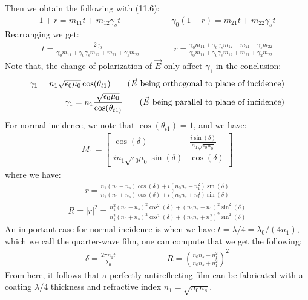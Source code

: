 \documentclass[11pt]{book}
\theoremstyle{break}
\theoremstyle{break}
\newcommand{\bmat}[1]{\begin{bmatrix} #1 \end{bmatrix}}
\begin{document}
Then we obtain the following with (11.6):
\begin{align*}
1+r = m_{11}t + m_{12}\gamma_s t \qquad\qquad\qquad \gamma_0 (1-r) = m_{21}t + m_{22}\gamma_s t
\end{align*}
Rearranging we get:
\begin{align*}
t = \frac{2\gamma_0}{\gamma_0 m_{11} +\gamma_0 \gamma_s m_{12} + m_{21}+\gamma_s m_{22}} \qquad\qquad r = \frac{\gamma_0 m_{11}+ \gamma_0 \gamma_s m_{12} - m_{21} - \gamma_s m_{22}}{\gamma_0 m_{11} + \gamma_0 \gamma_s m_{12} + m_{21} + \gamma_2 m_{22}}
\end{align*}
Note that, the change of polarization of $\vec{E}$ only affect $\gamma_1$ in the conclusion:
\begin{align*}
\gamma_1 = n_1 \sqrt{\epsilon_0 \mu_0}\cos(\theta_{t1}) \tag{$\vec{E}$ being orthogonal to plane of incidence}\\
\gamma_1 = n_1 \frac{\sqrt{\epsilon_0 \mu_0}}{\cos(\theta_{t1)}} \tag{$\vec{E}$ being parallel to plane of incidence}
\end{align*}
For normal incidence, we note that $\cos(\theta_{t1}) = 1$, and we have:
\begin{align*}
M_1 = \bmat{\cos(\delta) & \frac{i\sin(\delta)}{n_1 \sqrt{\epsilon_0 \mu_0}} \\ in_1 \sqrt{\epsilon_0 \mu_0}\sin(\delta) & \cos(\delta)} \tag{Normal Incidence}
\end{align*}
where we have:
\begin{align*}
r = \frac{n_1(n_0 - n_s) \cos(\delta)+ i (n_0 n_s - n_1^2)\sin(\delta)}{n_1(n_0 +n_s)\cos(\delta) + i (n_0 n_s+n_1^2) \sin(\delta)}   \tag{Normal Incidence}
\end{align*}
\begin{align*}
R = |r|^2 = \frac{n_1^2 ( n_0 - n_s)^2 \cos^2(\delta) + (n_0n_s-n_1)^2 \sin^2(\delta)}{n_1^2(n_0+n_s)^2\cos^2(\delta) + (n_0n_s+n_1^2)^2 \sin^2(\delta)}   \tag{Normal Incidence}
\end{align*}
An important case for normal incidence is when we have $t = \lambda / 4 = \lambda_0 / (4n_1)$, which we call the quarter-wave film, one can compute that we get the following:
\begin{align*}
\delta = \frac{2\pi n_1 t}{\lambda_0} \qquad\qquad\qquad R = \left( \frac{n_0n_s - n_1^2}{n_0n_s+n_1^2}\right)^2 \tag{Normal incidence quarter-wave $t$}
\end{align*}
From here, it follows that a perfectly antireflecting film can be fabricated with a coating $\lambda/4$ thickness and refractive index $n_1 = \sqrt{n_0 n_s}$.
\end{document}
